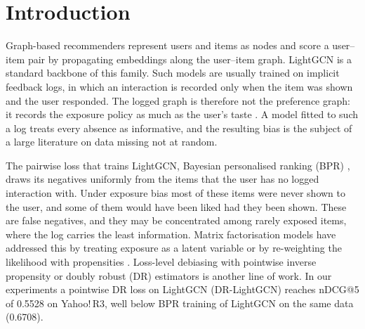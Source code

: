 \section{Introduction}\label{sec:intro}

Graph-based recommenders represent users and items as nodes and score a user--item
pair by propagating embeddings along the user--item graph. LightGCN
\citep{he2020lightgcn} is a standard backbone of this family. Such models are
usually trained on implicit feedback logs, in which an interaction is recorded only
when the item was shown and the user responded. The logged graph is therefore not
the preference graph: it records the exposure policy as much as the user's taste
\citep{marlin2009collaborative,chen2023bias}. A model fitted to such a log treats
every absence as informative, and the resulting bias is the subject of a large
literature on data missing not at random.

The pairwise loss that trains LightGCN, Bayesian personalised ranking (BPR)
\citep{rendle2009bpr}, draws its negatives uniformly from the items that the user
has no logged interaction with. Under exposure bias most of these items were never
shown to the user, and some of them would have been liked had they been shown.
These are false negatives, and they may be concentrated among rarely exposed items,
where the log carries the least information.
Matrix factorisation models have addressed this by treating exposure as a latent
variable \citep{liang2016exposure} or by re-weighting the likelihood with
propensities \citep{saito2020unbiased}. Loss-level debiasing with pointwise inverse
propensity or doubly robust (DR) estimators \citep{schnabel2016,wang2019drjl,guo2021mrdr}
is another line of work. In our experiments a
pointwise DR loss on LightGCN (DR-LightGCN) reaches nDCG@5 of 0.5528 on Yahoo!\,R3,
well below BPR training of LightGCN on the same data (0.6708).

